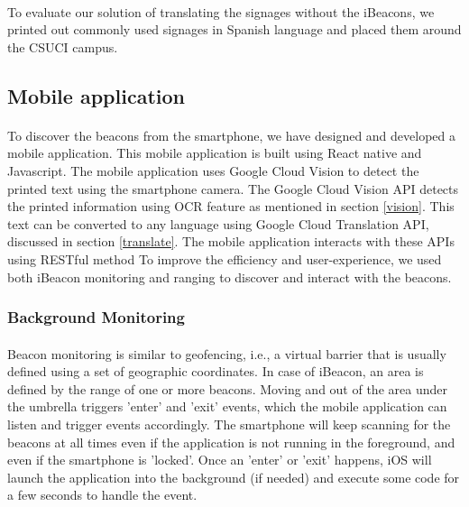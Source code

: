 \documentclass[12pt]{article}
\begin{document}
\paragraph{}To evaluate our solution of translating the signages without the iBeacons, we printed out commonly used  signages in Spanish language and placed them around the CSUCI campus. 

\subsection{Mobile application}

\paragraph{}
To discover the beacons from the smartphone, we have designed and developed a mobile application. This mobile application is built using React native and Javascript. The mobile application uses Google Cloud Vision to detect the printed text using the smartphone camera. The Google Cloud Vision API detects the printed information using OCR feature as mentioned in section  \ref{vision}. This text can be converted to any language using Google Cloud Translation API, discussed in section \ref{translate}. The mobile application interacts with these APIs using RESTful method  To improve the efficiency and user-experience, we used both iBeacon monitoring and ranging to discover and interact with the beacons.


\subsubsection{Background Monitoring}
\paragraph{}Beacon monitoring is similar to geofencing, i.e., a virtual barrier that is usually defined using a set of geographic coordinates. In case of iBeacon, an area is defined by the range of one or more beacons. Moving and out of the area under the umbrella triggers ’enter’ and ’exit’ events, which the mobile application can listen and trigger events accordingly. The smartphone will keep scanning for the beacons at all times even if the application is not running in the foreground, and even if the smartphone is 'locked'. Once an ’enter’ or ’exit’ happens, iOS will launch the application into the background (if needed) and execute some code for a few seconds to handle the event.
\end{document}
